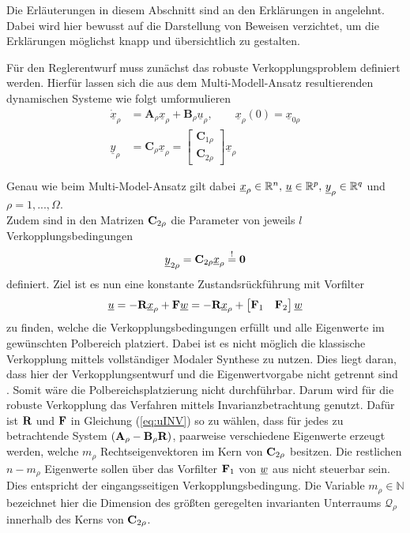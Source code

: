 
Die Erläuterungen in diesem Abschnitt sind an den Erklärungen in \cite{Schaub} angelehnt. Dabei wird hier bewusst auf die Darstellung von Beweisen verzichtet, um die Erklärungen möglichst knapp und übersichtlich zu gestalten.

Für den Reglerentwurf muss zunächst das robuste Verkopplungsproblem definiert werden.
Hierfür lassen sich die aus dem Multi-Modell-Ansatz resultierenden dynamischen Systeme wie folgt umformulieren
\begin{align}
	\underline{\dot{x}}_{\rho}  &= \textbf{A}_\rho \underline{x}_{\rho} + \textbf{B}_\rho \underline{u}_{\rho}, \qquad \underline{x}_{\rho}(0) = \underline{x}_{0\rho} \\
	\underline{y}_{\rho} &= \textbf{C}_\rho\underline{x}_{\rho} = \begin{bmatrix}\textbf{C}_{1\rho} \\ \textbf{C}_{2\rho} \end{bmatrix} \underline{x}_{\rho}
\end{align}

Genau wie beim Multi-Model-Ansatz gilt dabei $\underline{x}_{\rho}\in \mathbb{R}^{n},\, \underline{u}\in \mathbb{R}^{p},\, \underline{y}_{\rho}\in \mathbb{R}^{q}$ und $\rho = 1, ..., \Omega$.\\
Zudem sind in den Matrizen $\textbf{C}_{2\rho}$ die Parameter von jeweils $l$ Verkopplungsbedingungen
\begin{align}\label{eq:Koppl}
	\underline{y}_{2\rho} = \textbf{C}_{2\rho} \underline{x}_{\rho} \stackrel{!}{=} \textbf{0}
\end{align}
definiert.
Ziel ist es nun eine konstante Zustandsrückführung mit Vorfilter
\begin{equation}\label{eq:uINV}
	\underline{u} = -\textbf{R}\underline{x}_{\rho} + \textbf{F}\underline{w} = -\textbf{R}\underline{x}_{\rho} + \begin{bmatrix}\textbf{F}_{1} & \textbf{F}_{2} \end{bmatrix} \underline{w}
\end{equation}
zu finden, welche die Verkopplungsbedingungen erfüllt und alle Eigenwerte im gewünschten Polbereich platziert.
Dabei ist es nicht möglich die klassische Verkopplung mittels vollständiger Modaler Synthese zu nutzen. Dies liegt daran, dass hier der Verkopplungsentwurf und die Eigenwertvorgabe nicht getrennt sind \cite{Schaub}. Somit wäre die Polbereichsplatzierung nicht durchführbar. 
Darum wird für die robuste Verkopplung das Verfahren mittels Invarianzbetrachtung genutzt.
Dafür ist $\textbf{R}$ und $\textbf{F}$ in Gleichung (\ref{eq:uINV}) so zu wählen, dass für jedes zu betrachtende System $(\textbf{A}_{\rho}-\textbf{B}_{\rho}\textbf{R})$, paarweise verschiedene Eigenwerte erzeugt werden, welche $m_\rho$ Rechtseigenvektoren im Kern von $\textbf{C}_{2\rho}$ besitzen. Die restlichen $n-m_\rho$ Eigenwerte sollen über das Vorfilter $\textbf{F}_1$ von $\underline{w}$ aus nicht steuerbar sein. Dies entspricht der eingangsseitigen Verkopplungsbedingung.
Die Variable $m_\rho \in \mathbb{N}$ bezeichnet hier die Dimension des größten geregelten invarianten Unterraums $\mathcal{Q}_\rho$ innerhalb des Kerns von $\textbf{C}_{2\rho}$.

